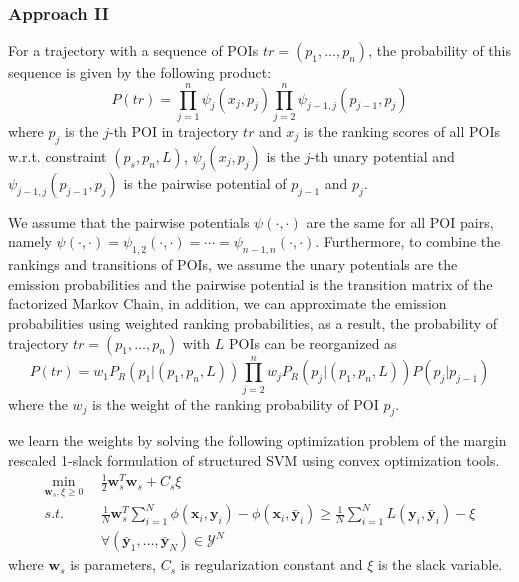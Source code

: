 \subsubsection{Approach II}
For a trajectory with a sequence of POIs $tr = (p_1, \dots, p_n)$, the probability of this sequence is given by the following product:
\begin{equation*}
    P(tr) = \prod_{j=1}^n \psi_j(x_j, p_j) \prod_{j=2}^n \psi_{j-1, j}(p_{j-1}, p_j)
\end{equation*}
where $p_j$ is the $j$-th POI in trajectory $tr$ and $x_j$ is the ranking scores of all POIs w.r.t. constraint $(p_s, p_n, L)$,
$\psi_j(x_j, p_j)$ is the $j$-th unary potential and $\psi_{j-1, j}(p_{j-1}, p_j)$ is the pairwise potential of $p_{j-1}$ and $p_j$.

We assume that the pairwise potentials $\psi(\cdot, \cdot)$ are the same for all POI pairs, 
namely $\psi(\cdot, \cdot) = \psi_{1,2}(\cdot, \cdot) = \cdots = \psi_{n-1, n}(\cdot, \cdot)$.
Furthermore, to combine the rankings and transitions of POIs,
we assume the unary potentials are the emission probabilities 
and the pairwise potential is the transition matrix of the factorized Markov Chain,
in addition, we can approximate the emission probabilities using weighted ranking probabilities,
as a result, the probability of trajectory $tr = (p_1, \dots, p_n)$ with $L$ POIs can be reorganized as 
\begin{equation*}
    P(tr) = w_1 P_R(p_1|(p_1, p_n, L)) \prod_{j=2}^n w_j P_R(p_j |(p_1, p_n, L)) P(p_j |p_{j-1})
\end{equation*}
where the $w_j$ is the weight of the ranking probability of POI $p_j$.

we learn the weights by solving the following optimization problem of the margin rescaled
1-slack formulation of structured SVM\cite{ssvm09} using convex optimization tools.
\begin{align*}
\min_{\mathbf{w}_s, \xi \ge 0} ~~& \frac{1}{2} \mathbf{w}_s^T \mathbf{w}_s + C_s \xi \\
s.t. ~~& \frac{1}{N} \mathbf{w}_s^T \sum_{i=1}^N \phi(\mathbf{x}_i, \mathbf{y}_i) - \phi(\mathbf{x}_i, \bar{\mathbf{y}}_i) \ge 
         \frac{1}{N} \sum_{i=1}^N L(\mathbf{y}_i, \bar{\mathbf{y}}_i) - \xi \\
    ~~& \forall(\bar{\mathbf{y}}_1, \dots, \bar{\mathbf{y}}_N) \in \mathcal{Y}^N
\end{align*}
where $\mathbf{w}_s$ is parameters, $C_s$ is regularization constant and $\xi$ is the slack variable.
